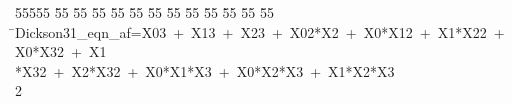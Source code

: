 %
%
\begin{tabbing}
55555 \= 55 \= 55 \= 55 \= 55 \= 55 \= 55 \= 55 \= 55 \= 55 \= 55 \= 55 \= 55 \= \>Dickson31\_eqn\_af=X03\ +\ X13\ +\ X23\ +\ X02*X2\ +\ X0*X12\ +\ X1*X22\ +\ X0*X32\ +\ X1\\[0pt]
\>*X32\ +\ X2*X32\ +\ X0*X1*X3\ +\ X0*X2*X3\ +\ X1*X2*X3\\[0pt]
2\>\end{tabbing}
